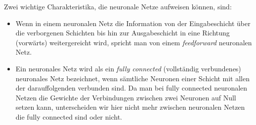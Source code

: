 %        
%        
%        
%        
%        
%        
%        
%    
%    
Zwei wichtige Charakteristika, die neuronale Netze aufweisen können, sind:
\begin{itemize}
\item Wenn in einem neuronalen Netz die Information von der Eingabeschicht über die verborgenen Schichten bis hin zur Ausgabeschicht in eine Richtung (\glqq vorwärts\grqq) weitergereicht wird, spricht man von einem \textit{feedforward} neuronalen Netz.
\item Ein neuronales Netz wird als ein \textit{fully connected} (\glqq vollständig verbundenes\grqq\@) neuronales Netz bezeichnet, wenn sämtliche Neuronen einer Schicht mit allen der darauffolgenden verbunden sind. Da man bei fully connected neuronalen Netzen die Gewichte der Verbindungen zwischen zwei Neuronen auf Null setzen kann, unterscheiden wir hier nicht mehr zwischen neuronalen Netzen die fully connected sind oder nicht.
\end{itemize}
